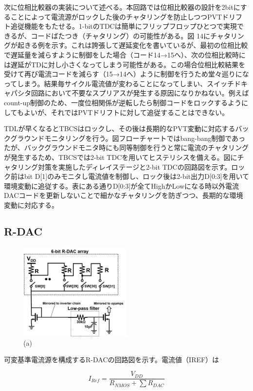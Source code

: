 \documentclass[letterpaper, 10 pt, conference]{ieeeconf}  %
\begin{document}
次に位相比較器の実装について述べる。本回路では位相比較器の設計を2bitにすることによって電流源がロックした後のチャタリングを防止しつつPVTドリフト追従機能をもたせる。1-bitのTDCは簡単にフリップフロップひとつで実現できるが、コードばたつき（チャタリング）の可能性がある。図 14にチャタリングが起きる例を示す。これは誇張して遅延変化を書いているが、最初の位相比較で遅延量を減らすように制御をした場合（コード14→15へ）、次の位相比較時には遅延がTDに対し小さくなってしまう可能性がある。この場合位相比較結果を受けて再び電流コードを減らす（15→14へ）ように制御を行うため堂々巡りになってしまう。結果毎サイクル電流値が変わることになってしまい、スイッチドキャパシタ回路において不要なスプリアスが発生する原因になりかねない。例えばcount-up制御のため、一度位相関係が逆転したら制御コードをロックするようにしてもよいが、それではPVTドリフトに対して追従することはできない。

TDLが早くなるとTBCSはロックし、その後は長期的なPVT変動に対応するバックグラウンドモニタリングを行う。図フローチャートではbang-bang制御であったが、バックグラウンドモニタ時にも同等制御を行うと常に電流のチャタリングが発生するため、TBCSでは2-bit TDCを用いてヒステリシスを備える。図にチャタリング対策を実施したディレイステージと2-bit TDCの回路図を示す。ロック前はbit D[1]のみモニタし電流値を制御し、ロック後は2-bit出力D[0:3]を用いて環境変動に追従する。表にある通りD[0:3]が全てHighかLowになる時以外電流DACコードを更新しないことで細かなチャタリングを防ぎつつ、長期的な環境変動に対応する。

\subsection{R-DAC}
\begin{figure}[!]
\centering
 \includegraphics[width=0.5\textwidth]{figs/rdac.png}
  \caption{(a) 
}
\label{fig2}
\end{figure}
可変基準電流源を構成するR-DACの回路図を示す。電流値（IREF）は

$$I_{Ref} = \frac{V_{DD}}{R_{NMOS}+\sum R_{DAC}}$$
\end{document}
